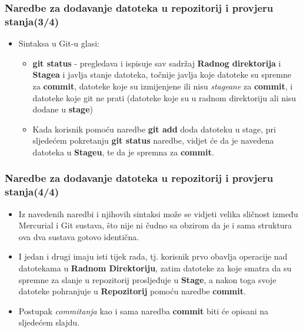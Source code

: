 \documentclass{beamer}
\begin{document}
	\begin{frame}
		\frametitle{Naredbe za dodavanje datoteka u repozitorij i provjeru stanja(3/4)}
 		\begin{itemize}
  		  	\item Sintaksa u Git-u glasi:
			\begin{itemize}
				  \item \textbf{git status} - pregledava i ispisuje sav sadržaj \textbf{Radnog direktorija} i \textbf{Stagea} i javlja stanje datoteka, točnije javlja koje datoteke su spremne za \textbf{commit}, datoteke koje su izmijenjene ili nisu \textit{stageane} za \textbf{commit}, i datoteke koje git ne prati (datoteke koje su u radnom direktoriju ali nisu dodane u \textbf{stage})
				  \item Kada korisnik pomoću naredbe \textbf{git add} doda datoteku u stage, pri sljedećem pokretanju \textbf{git status} naredbe, vidjet će da je navedena datoteka u \textbf{Stageu}, te da je spremna za \textbf{commit}.
		  	\end{itemize}
		\end{itemize}
	\end{frame}

	\begin{frame}
		\frametitle{Naredbe za dodavanje datoteka u repozitorij i provjeru stanja(4/4)}
 		\begin{itemize}
			\item Iz navedenih naredbi i njihovih sintaksi može se vidjeti velika sličnost između Mercurial i Git sustava, što nije ni čudno sa obzirom da je i sama struktura ova dva sustava gotovo identična.
			\item I jedan i drugi imaju isti tijek rada, tj. korisnik prvo obavlja operacije nad datotekama u \textbf{Radnom Direktoriju}, zatim datoteke za koje smatra da su spremne za slanje u repozitorij prosljeđuje u \textbf{Stage}, a nakon toga svoje datoteke pohranjuje u \textbf{Repozitorij} pomoću naredbe \textbf{commit}.
			\item Postupak \textit{commitanja} kao i sama naredba \textbf{commit} biti će opisani na sljedećem slajdu.
		\end{itemize}
	\end{frame}
\end{document}

